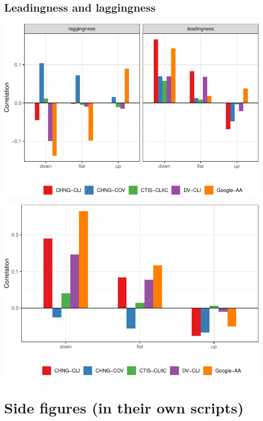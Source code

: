 \documentclass[9pt,twoside,lineno]{pnas-new}
\begin{document}
\hypertarget{leadingness-and-laggingness}{%
\subsection{Leadingness and
laggingness}\label{leadingness-and-laggingness}}

\begin{center}\includegraphics[width=\linewidth]{fig/leading-and-lagging-1} \end{center}

\begin{center}\includegraphics[width=\linewidth]{fig/diff-in-lead-lag-1} \end{center}

\hypertarget{side-figures-in-their-own-scripts}{%
\section{Side figures (in their own
scripts)}\label{side-figures-in-their-own-scripts}}
\end{document}
